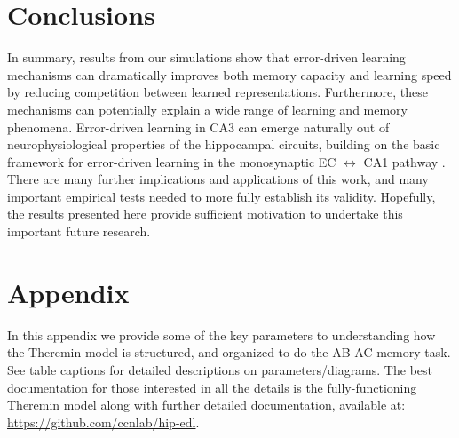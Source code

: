 \documentclass[11pt,twoside]{article}
\newif\myifpdf
\begin{document}
\section{Conclusions}

In summary, results from our simulations show that error-driven learning mechanisms can dramatically improves both memory capacity and learning speed by reducing competition between learned representations.  Furthermore, these mechanisms can potentially explain a wide range of learning and memory phenomena.  Error-driven learning in CA3 can emerge naturally out of neurophysiological properties of the hippocampal circuits, building on the basic framework for error-driven learning in the monosynaptic EC $\leftrightarrow$ CA1 pathway \citep{KetzMorkondaOReilly13}.  There are many further implications and applications of this work, and many important empirical tests needed to more fully establish its validity.  Hopefully, the results presented here provide sufficient motivation to undertake this important future research.


\section{Appendix}

In this appendix we provide some of the key parameters to understanding how the Theremin model is structured, and organized to do the AB-AC memory task.  See table captions for detailed descriptions on parameters/diagrams.  The best documentation for those interested in all the details is the fully-functioning Theremin model along with further detailed documentation, available at: \url{https://github.com/ccnlab/hip-edl}.   
\end{document}
